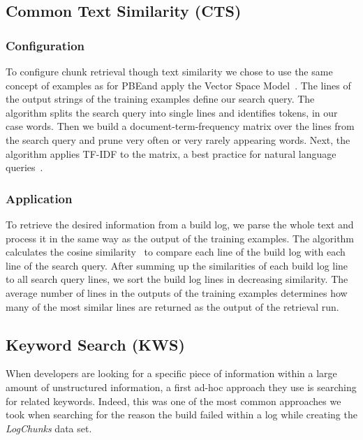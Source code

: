 \subsection{Common Text Similarity (CTS)}
\label{sec:expl-ts}

\subsubsection{Configuration}
To configure chunk retrieval though text similarity we chose to use the same concept of examples as for PBE\@ and apply the Vector Space Model~\cite{schutze2008introduction}.
The lines of the output strings of the training examples define our search query.
The algorithm splits the search query into single lines and identifies tokens, in our case words.
Then we build a document-term-frequency matrix over the lines from the search query and prune very often or very rarely appearing words.
Next, the algorithm applies TF-IDF to the matrix, a best practice for natural language queries~\cite{lee1997document}.

\subsubsection{Application}
To retrieve the desired information from a build log, we parse the whole text and process it in the same way as the output of the training examples.
The algorithm calculates the cosine similarity~\cite{korenius2007principal} to compare each line of the build log with each line of the search query.
After summing up the similarities of each build log line to all search query lines, we sort the build log lines in decreasing similarity.
The average number of lines in the outputs of the training examples determines how many of the most similar lines are returned as the output of the retrieval run.

\subsection{Keyword Search (KWS)}
\label{sec:expl-skws}
When developers are looking for a specific piece of information within a large amount of unstructured information, a first ad-hoc approach they use is searching for related keywords.
Indeed, this was one of the most common approaches we took when searching for the reason the build failed within a log while creating the \emph{LogChunks} data set.

